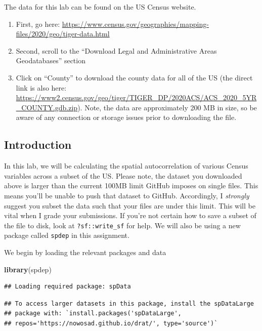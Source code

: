 \documentclass[
]{article}
\newenvironment{Shaded}{\begin{snugshade}}{\end{snugshade}}
\newcommand{\FunctionTok}[1]{\textcolor[rgb]{0.13,0.29,0.53}{\textbf{#1}}}
\newcommand{\NormalTok}[1]{#1}
\begin{document}
The data for this lab can be found on the US Census website.

\begin{enumerate}
\def\labelenumi{\arabic{enumi}.}
\item
  First, go here:
  \url{https://www.census.gov/geographies/mapping-files/2020/geo/tiger-data.html}
\item
  Second, scroll to the ``Download Legal and Administrative Areas
  Geodatabases'' section
\item
  Click on ``County'' to download the county data for all of the US (the
  direct link is also here:
  \url{https://www2.census.gov/geo/tiger/TIGER_DP/2020ACS/ACS_2020_5YR_COUNTY.gdb.zip}).
  Note, the data are approximately 200 MB in size, so be aware of any
  connection or storage issues prior to downloading the file.
\end{enumerate}

\subsection{Introduction}\label{introduction}

In this lab, we will be calculating the spatial autocorrelation of
various Census variables across a subset of the US. Please note, the
dataset you downloaded above is larger than the current 100MB limit
GitHub imposes on single files. This means you'll be unable to push that
dataset to GitHub. Accordingly, I \emph{strongly} suggest you subset the
data such that your files are under this limit. This will be vital when
I grade your submissions. If you're not certain how to save a subset of
the file to disk, look at \texttt{?sf::write\_sf} for help. We will also
be using a new package called \texttt{spdep} in this assignment.

We begin by loading the relevant packages and data

\begin{Shaded}
\begin{Highlighting}[]
\FunctionTok{library}\NormalTok{(spdep)}
\end{Highlighting}
\end{Shaded}

\begin{verbatim}
## Loading required package: spData
\end{verbatim}

\begin{verbatim}
## To access larger datasets in this package, install the spDataLarge
## package with: `install.packages('spDataLarge',
## repos='https://nowosad.github.io/drat/', type='source')`
\end{verbatim}
\end{document}
